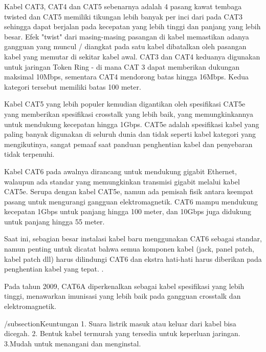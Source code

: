Kabel CAT3, CAT4 dan CAT5 sebenarnya adalah 4 pasang kawat tembaga twisted dan CAT5 memiliki tikungan lebih banyak per inci dari pada CAT3 sehingga dapat berjalan pada kecepatan yang lebih tinggi dan panjang yang lebih besar. Efek "twist" dari masing-masing pasangan di kabel memastikan adanya gangguan yang muncul / diangkat pada satu kabel dibatalkan oleh pasangan kabel yang memutar di sekitar kabel awal. CAT3 dan CAT4 keduanya digunakan untuk jaringan Token Ring - di mana CAT 3 dapat memberikan dukungan maksimal 10Mbps, sementara CAT4 mendorong batas hingga 16Mbps. Kedua kategori tersebut memiliki batas 100 meter.

Kabel CAT5 yang lebih populer kemudian digantikan oleh spesifikasi CAT5e yang memberikan spesifikasi crosstalk yang lebih baik, yang memungkinkannya untuk mendukung kecepatan hingga 1Gbps. CAT5e adalah spesifikasi kabel yang paling banyak digunakan di seluruh dunia dan tidak seperti kabel kategori yang mengikutinya, sangat pemaaf saat panduan penghentian kabel dan penyebaran tidak terpenuhi.

Kabel CAT6 pada awalnya dirancang untuk mendukung gigabit Ethernet, walaupun ada standar yang memungkinkan transmisi gigabit melalui kabel CAT5e. Serupa dengan kabel CAT5e, namun ada pemisah fisik antara keempat pasang untuk mengurangi gangguan elektromagnetik. CAT6 mampu mendukung kecepatan 1Gbps untuk panjang hingga 100 meter, dan 10Gbps juga didukung untuk panjang hingga 55 meter.

Saat ini, sebagian besar instalasi kabel baru menggunakan CAT6 sebagai standar, namun penting untuk dicatat bahwa semua komponen kabel (jack, panel patch, kabel patch dll) harus dilindungi CAT6 dan ekstra hati-hati harus diberikan pada penghentian kabel yang tepat. .

Pada tahun 2009, CAT6A diperkenalkan sebagai kabel spesifikasi yang lebih tinggi, menawarkan imunisasi yang lebih baik pada gangguan crosstalk dan elektromagnetik.

/subsection{Keuntungan}
1. Suara listrik masuk atau keluar dari kabel bisa dicegah.
2. Bentuk kabel termurah yang tersedia untuk keperluan jaringan.
3.Mudah untuk menangani dan menginstal.

